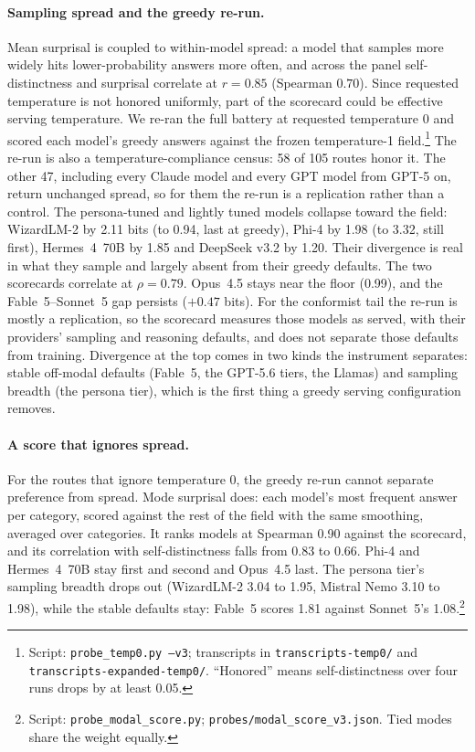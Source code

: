\documentclass[11pt]{article}
\begin{document}
\paragraph{Sampling spread and the greedy re-run.}
Mean surprisal is coupled to within-model spread: a model that samples more widely hits lower-probability answers more often, and across the panel self-distinctness and surprisal correlate at $r = 0.85$ (Spearman $0.70$). Since requested temperature is not honored uniformly, part of the scorecard could be effective serving temperature. We re-ran the full battery at requested temperature 0 and scored each model's greedy answers against the frozen temperature-1 field.\footnote{Script: \texttt{probe\_temp0.py --v3}; transcripts in \texttt{transcripts-temp0/} and \texttt{transcripts-expanded-temp0/}. ``Honored'' means self-distinctness over four runs drops by at least 0.05.} The re-run is also a temperature-compliance census: 58 of 105 routes honor it. The other 47, including every Claude model and every GPT model from GPT-5 on, return unchanged spread, so for them the re-run is a replication rather than a control. The persona-tuned and lightly tuned models collapse toward the field: WizardLM-2 by 2.11 bits (to 0.94, last at greedy), Phi-4 by 1.98 (to 3.32, still first), Hermes~4~70B by 1.85 and DeepSeek v3.2 by 1.20. Their divergence is real in what they sample and largely absent from their greedy defaults. The two scorecards correlate at $\rho = 0.79$. Opus~4.5 stays near the floor (0.99), and the Fable~5--Sonnet~5 gap persists ($+0.47$ bits). For the conformist tail the re-run is mostly a replication, so the scorecard measures those models as served, with their providers' sampling and reasoning defaults, and does not separate those defaults from training. Divergence at the top comes in two kinds the instrument separates: stable off-modal defaults (Fable~5, the GPT-5.6 tiers, the Llamas) and sampling breadth (the persona tier), which is the first thing a greedy serving configuration removes.

\paragraph{A score that ignores spread.}
For the routes that ignore temperature 0, the greedy re-run cannot separate preference from spread. Mode surprisal does: each model's most frequent answer per category, scored against the rest of the field with the same smoothing, averaged over categories. It ranks models at Spearman 0.90 against the scorecard, and its correlation with self-distinctness falls from 0.83 to 0.66. Phi-4 and Hermes~4~70B stay first and second and Opus~4.5 last. The persona tier's sampling breadth drops out (WizardLM-2 3.04 to 1.95, Mistral Nemo 3.10 to 1.98), while the stable defaults stay: Fable~5 scores 1.81 against Sonnet~5's 1.08.\footnote{Script: \texttt{probe\_modal\_score.py}; \texttt{probes/modal\_score\_v3.json}. Tied modes share the weight equally.}
\end{document}
